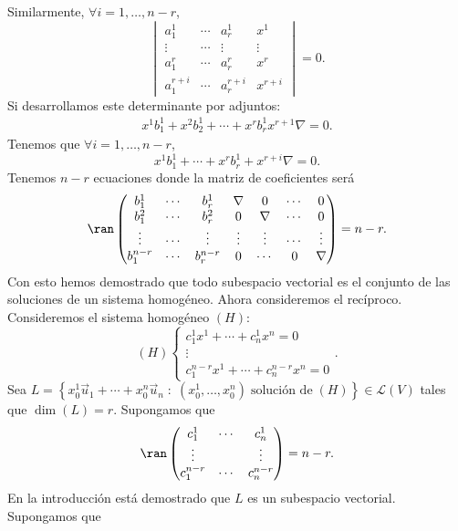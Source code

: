 Similarmente, $\displaystyle \forall i = 1, \ldots, n - r $,
	\[\begin{vmatrix} a^{1}_{1} & \cdots & a^{1}_{r} & x^{1} \\
		\vdots & \cdots & \vdots & \vdots \\
	a^{r}_{1} & \cdots & a^{r}_{r} & x^{r} \\
a^{r+i}_{1} & \cdots & a^{r+i}_{r} & x^{r+i}\end{vmatrix}  = 0 .\]
Si desarrollamos este determinante por adjuntos:
\[
\begin{split}
x^{1}b^{1}_{1} + x^{2}b^{1}_{2} + \cdots + x^{r}b^{1}_{r} x^{r+1} \nabla = 0.
\end{split}
\]
Tenemos que $\displaystyle \forall i = 1, \ldots, n -r $, 
\[x^{1}b^{1}_{1} + \cdots + x^{r}b^{1}_{r} + x^{r+i}\nabla = 0 .\]
Tenemos $\displaystyle n - r $ ecuaciones donde la matriz de coeficientes será
\[\ran \begin{pmatrix} b^{1}_{1} & \cdots & b^{1}_{r} & \nabla & 0 & \cdots & 0 \\
b^{2}_{1} & \cdots & b^{2}_{r} & 0 & \nabla & \cdots & 0 \\
\vdots & \cdots & \vdots & \vdots & \vdots & \cdots & \vdots \\
b^{n-r}_{1} & \cdots & b^{n-r}_{r} & 0 & \cdots & 0 & \nabla\end{pmatrix} = n - r .\]
Con esto hemos demostrado que todo subespacio vectorial es el conjunto de las soluciones de un sistema homogéneo. Ahora consideremos el recíproco. Consideremos el sistema homogéneo $\displaystyle \left(H\right) $:
\[\left(H\right)
\begin{cases}
c^{1}_{1}x^{1} + \cdots + c^{1}_{n}x^{n} = 0 \\
\vdots \\
c^{n-r}_{1}x^{1} + \cdots + c^{n-r}_{n}x^{n} = 0
\end{cases}
.\]
Sea $\displaystyle L = \left\{ x^{1}_{0}\vec{u}_{1} + \cdots + x^{n}_{0}\vec{u}_{n} \; : \; \left(x^{1}_{0}, \ldots, x^{n}_{0}\right) \; \text{solución de} \; \left(H\right)\right\} \in \mathcal{L}\left(V\right) $ tales que $\displaystyle \dim\left(L\right)=r $. Supongamos que 
\[\ran\begin{pmatrix} c^{1}_{1} & \cdots & c^{1}_{n} \\ \vdots & & \vdots \\ c^{n-r}_{1} & \cdots & c^{n-r}_{n} \end{pmatrix} = n-r .\]
En la introducción está demostrado que $\displaystyle L $ es un subespacio vectorial. Supongamos que
